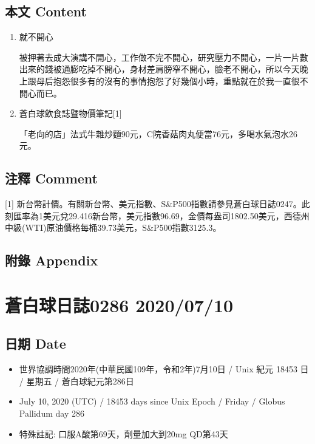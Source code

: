 \documentclass[a5paper, 11pt
]{book}
\providecommand{\tightlist}{%
  \setlength{\itemsep}{0pt}\setlength{\parskip}{0pt}}
\begin{document}
\hypertarget{ux672cux6587-content-38}{%
\subsection{本文 Content}\label{ux672cux6587-content-38}}

\begin{enumerate}
\def\labelenumi{\arabic{enumi}.}
\item
  就不開心

  被押著去成大演講不開心，工作做不完不開心，研究壓力不開心，一片一片數出來的錢被通膨吃掉不開心，身材差肩膀窄不開心，臉老不開心，所以今天晚上跟母后抱怨很多有的沒有的事情抱怨了好幾個小時，重點就在於我一直很不開心而已。
\item
  蒼白球飲食誌暨物價筆記{[}1{]}

  「老向的店」法式牛雜炒麵90元，C院香菇肉丸便當76元，多喝水氣泡水26元。
\end{enumerate}

\hypertarget{ux6ce8ux91cb-comment-38}{%
\subsection{注釋 Comment}\label{ux6ce8ux91cb-comment-38}}

{[}1{]}
新台幣計價。有關新台幣、美元指數、S\&P500指數請參見蒼白球日誌0247。此刻匯率為1美元兌29.416新台幣，美元指數96.69，金價每盎司1802.50美元，西德州中級(WTI)原油價格每桶39.73美元，S\&P500指數3125.3。

\hypertarget{ux9644ux9304-appendix-38}{%
\subsection{附錄 Appendix}\label{ux9644ux9304-appendix-38}}

\hypertarget{ux84bcux767dux7403ux65e5ux8a8c0286-20200710}{%
\section{蒼白球日誌0286
2020/07/10}\label{ux84bcux767dux7403ux65e5ux8a8c0286-20200710}}

\hypertarget{ux65e5ux671f-date-39}{%
\subsection{日期 Date}\label{ux65e5ux671f-date-39}}

\begin{itemize}
\tightlist
\item
  世界協調時間2020年(中華民國109年，令和2年)7月10日 / Unix 紀元 18453 日
  / 星期五 / 蒼白球紀元第286日
\item
  July 10, 2020 (UTC) / 18453 days since Unix Epoch / Friday / Globus
  Pallidum day 286
\item
  特殊註記: 口服A酸第69天，劑量加大到20mg QD第43天
\end{itemize}
\end{document}
